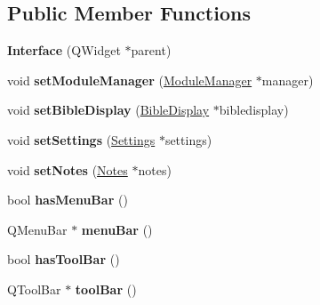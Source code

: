 \subsection*{Public Member Functions}
\begin{DoxyCompactItemize}
\item 
\hypertarget{classInterface_a2ce763f14c7c5ba61465c0efb59ddb0e}{
{\bfseries Interface} (QWidget $\ast$parent)}
\label{classInterface_a2ce763f14c7c5ba61465c0efb59ddb0e}

\item 
\hypertarget{classInterface_a2fc3cbc8adafa962e916c3f91bbd26fe}{
void {\bfseries setModuleManager} (\hyperlink{classModuleManager}{ModuleManager} $\ast$manager)}
\label{classInterface_a2fc3cbc8adafa962e916c3f91bbd26fe}

\item 
\hypertarget{classInterface_a3830ec3a0b94d7a655adfc2f9fed0d6b}{
void {\bfseries setBibleDisplay} (\hyperlink{classBibleDisplay}{BibleDisplay} $\ast$bibledisplay)}
\label{classInterface_a3830ec3a0b94d7a655adfc2f9fed0d6b}

\item 
\hypertarget{classInterface_a9268405fd7412cb4e38a1f9e1a5fb3e7}{
void {\bfseries setSettings} (\hyperlink{classSettings}{Settings} $\ast$settings)}
\label{classInterface_a9268405fd7412cb4e38a1f9e1a5fb3e7}

\item 
\hypertarget{classInterface_a8abf5b259a725752ffbaf97a03d9f9ff}{
void {\bfseries setNotes} (\hyperlink{classNotes}{Notes} $\ast$notes)}
\label{classInterface_a8abf5b259a725752ffbaf97a03d9f9ff}

\item 
\hypertarget{classInterface_a8339f6b421c6a17c0cee1c34e8ea79e3}{
bool {\bfseries hasMenuBar} ()}
\label{classInterface_a8339f6b421c6a17c0cee1c34e8ea79e3}

\item 
\hypertarget{classInterface_a467fb91495c208371c695a3bc50925e7}{
QMenuBar $\ast$ {\bfseries menuBar} ()}
\label{classInterface_a467fb91495c208371c695a3bc50925e7}

\item 
\hypertarget{classInterface_abdfda3623aee5d49cd064b53a5377159}{
bool {\bfseries hasToolBar} ()}
\label{classInterface_abdfda3623aee5d49cd064b53a5377159}

\item 
\hypertarget{classInterface_a3acd23969207fb790c9e9ab8c696ff77}{
QToolBar $\ast$ {\bfseries toolBar} ()}
\label{classInterface_a3acd23969207fb790c9e9ab8c696ff77}

\end{DoxyCompactItemize}
